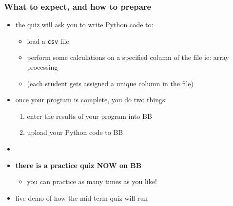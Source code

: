 \documentclass[english,14pt]{beamer}
\begin{document}
\begin{frame}[fragile]

\frametitle{What to expect, and how to prepare}

\begin{itemize}
	\item the quiz will ask you to write Python code to:
	\begin{itemize}
		\item load a \texttt{csv} file
		\item perform some calculations on a specified column of the file ie: array processing
		\item[] (each student gets assigned a unique column in the file)
	\end{itemize}
	\item once your program is complete, you do two things:
	\begin{enumerate}
		\item enter the results of your program into BB
		\item upload your Python code to BB
	\end{enumerate}
	\item[]
	\item \textbf{there is a practice quiz NOW on BB}
	\begin{itemize}
		\item you can practice as many times as you like!
	\end{itemize}
	\item live demo of how the mid-term quiz will run
\end{itemize}

\end{frame}

\end{document}
